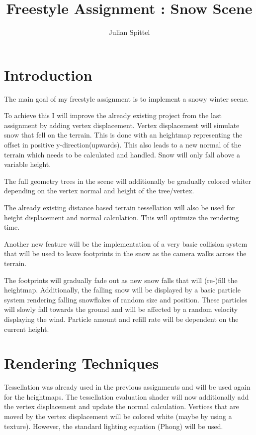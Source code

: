 \documentclass[paper=a4]{article}
\author{Julian Spittel}
\begin{document}
	\title{Freestyle Assignment : Snow Scene}
	\maketitle
	\tableofcontents
	\newpage
	\section{Introduction}
	
	 
	 The main goal of my freestyle assignment is to implement a snowy winter scene. 
	 
	 To achieve this I will improve the already existing project from the last assignment by adding vertex displacement. Vertex displacement will simulate snow that fell on the terrain. This is done with an heightmap representing the offset in positive y-direction(upwards). This also leads to a new normal of the terrain which needs to be calculated and handled. Snow will only fall above a 
	 variable height.
	 
	 The full geometry trees in the scene will additionally be gradually colored whiter depending on the vertex normal and height of the tree/vertex.
	 
	 The already existing distance based terrain tessellation will also be used for height displacement and normal calculation. This will optimize the rendering time.
	 
	 Another new feature will be the implementation of a very basic collision system that will be used to leave footprints in the snow as the camera walks across the terrain. 
	 
	 The footprints will gradually fade out as new snow falls that will (re-)fill the heightmap. Additionally, the falling snow will be displayed by a basic particle system rendering falling snowflakes of random size and position. These particles will slowly fall towards the ground and will be affected by a random velocity displaying the wind. Particle amount and refill rate will be dependent on the current height.
	
	\section{Rendering Techniques}
	
	Tessellation was already used in the previous assignments and will be used again for the heightmaps. The tessellation evaluation shader will now additionally add the vertex displacement and update the normal calculation.
	Vertices that are moved by the vertex displacement will be colored white (maybe by using a texture). However, the standard lighting equation (Phong) will be used.
	
\end{document}
